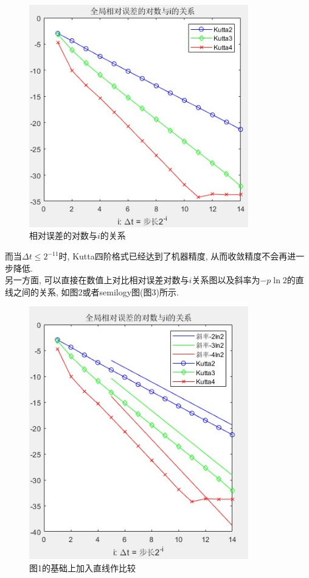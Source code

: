 \documentclass[12pt]{article}
\begin{document}
\begin{figure}[H]
	\centering
	\includegraphics[width=0.85\textwidth]{1}
	\caption{相对误差的对数与$i$的关系}
\end{figure}
\noindent 而当$\Delta{t}\le 2^{-11}$时, Kutta四阶格式已经达到了机器精度, 从而收敛精度不会再进一步降低.\\
另一方面, 可以直接在数值上对比相对误差对数与$i$关系图以及斜率为$-p\ln2$的直线之间的关系, 如图2或者semilogy图(图3)所示.
\begin{figure}[H]
	\centering
	\includegraphics[width=0.85\textwidth]{2}
	\caption{图1的基础上加入直线作比较}
\end{figure}
\end{document}

